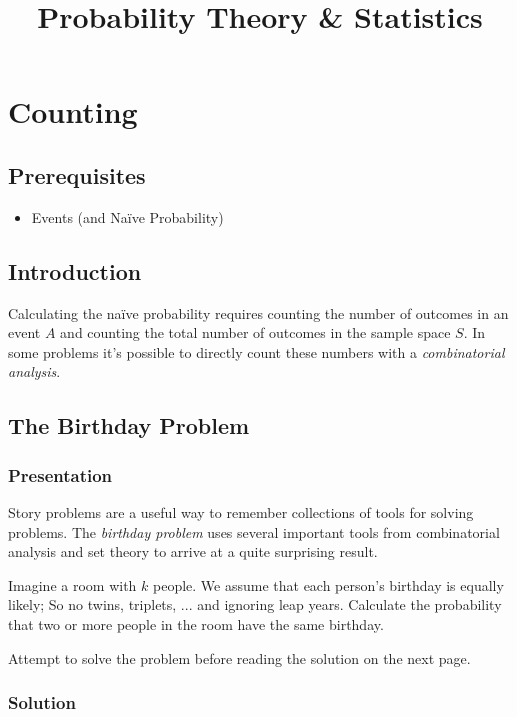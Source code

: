 \documentclass[11pt,a4paper]{article}
\title{Probability Theory \& Statistics}
\begin{document}
\maketitle
\newpage

\section{Counting}

\subsection{Prerequisites}

\begin{itemize}
\item
Events (and Naïve Probability)
\end{itemize}

\subsection{Introduction}

Calculating the naïve probability requires counting 
the number of outcomes in an event \(A\)
and counting the total number of outcomes in the sample space \(S\). 
In some problems it's possible to directly count these numbers with a \emph{combinatorial analysis}. 

\subsection{The Birthday Problem}

\subsubsection{Presentation}

Story problems are a useful way to remember collections of tools for solving problems. 
The \emph{birthday problem} uses several important tools from combinatorial
analysis and set theory to arrive at a quite surprising result.

Imagine a room with \(k\) people. 
We assume that each person's birthday is equally likely;
So no twins, triplets, ... and ignoring leap years.
Calculate the probability that two or more people in the room have the same birthday.

Attempt to solve the problem before reading the solution on the next page.

\newpage
\subsubsection{Solution}
\end{document}
